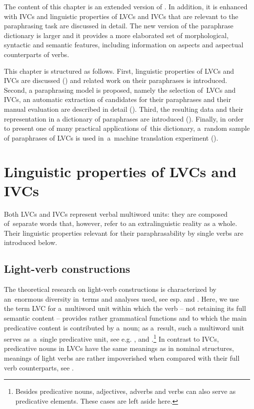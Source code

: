 \documentclass[output=paper
,modfonts
,nonflat]{langsci/langscibook}
\begin{document}
The content of this chapter is an extended version of \citet{barancikova2017paradi}.
In addition, it is enhanced with IVCs and linguistic properties of LVCs and IVCs 
that are relevant to the paraphrasing task are discussed in detail. The 
new version of the paraphrase dictionary is larger and it provides a more 
elaborated set of morphological, syntactic and semantic features, including 
information on aspects and aspectual counterparts of verbs.

This chapter is structured as follows. First, linguistic properties of LVCs and 
IVCs  are discussed () and related work on their paraphrases is 
introduced. Second, a paraphrasing model is proposed, namely the 
selection of~LVCs and IVCs, an automatic extraction of candidates for their 
paraphrases and their manual evaluation are described in detail (). 
Third, the resulting data and their representation in a dictionary of 
paraphrases are introduced (). Finally, in order to present one 
of many practical applications of~this dictionary, a~random sample of 
paraphrases of LVCs is used in~a~machine translation experiment (). 

\section{Linguistic properties of LVCs and IVCs}
\label{liguistic}
Both LVCs and IVCs represent verbal multiword units: they are composed 
of~separate words that, however, refer to an extralinguistic reality as a whole. 
Their linguistic properties relevant for their paraphrasability by single verbs 
are introduced below. 

\subsection{Light-verb constructions}
\label{LVCs}
The theoretical research on light-verb constructions is characterized by 
an~enormous diversity in~terms and analyses used, see esp. \citet{amberber-10} 
and \citet{alsina-97}. Here, we use the term  LVC for a~multiword unit within 
which the verb -- not retaining its full semantic content -- provides rather 
grammatical functions and to which the main predicative content is contributed 
by a~noun; as a~result, such a multiword unit serves as~a~single predicative 
unit, see e.g. \citet{algeo-95}, \citet{alsina-97} and 
\citet{butt-2010}.\footnote{Besides predicative nouns, adjectives, adverbs and
verbs can also serve as predicative elements. These cases are left aside 
here.} In contrast to IVCs, predicative nouns in LVCs have the same meanings 
as in nominal structures, meanings of light verbs are rather impoverished when 
compared with their full verb counterparts, see . 
\end{document}
